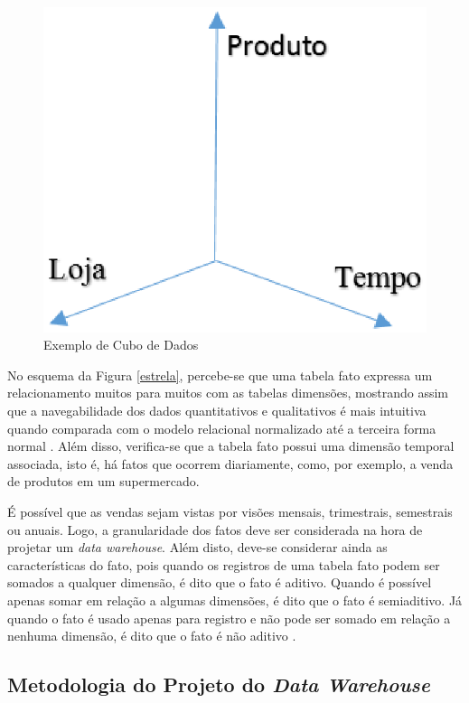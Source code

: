 \begin{figure}[h!]
\centering
\includegraphics[keepaspectratio=false,scale=0.85]{figuras/cube.eps}
\caption{Exemplo de Cubo de Dados}
\label{cube}
\end{figure}
\FloatBarrier


No esquema da Figura \ref{estrela}, percebe-se que uma tabela fato expressa um relacionamento muitos para muitos com as tabelas dimensões, mostrando assim que a navegabilidade dos dados quantitativos e qualitativos é mais intuitiva quando comparada com o modelo relacional normalizado até a terceira forma normal \cite{Kimball2002}. Além disso, verifica-se que a tabela fato possui uma dimensão temporal associada, isto é, há fatos que ocorrem diariamente, como, por exemplo, a venda de produtos em um supermercado. 

É possível que as vendas sejam vistas por visões mensais, trimestrais, semestrais ou anuais. Logo, a granularidade dos fatos deve ser considerada na hora de projetar um \textit{data warehouse}. Além disto, deve-se considerar ainda as características do fato, pois quando os registros de uma tabela fato podem ser somados a qualquer dimensão, é dito que o fato é aditivo. Quando é possível apenas somar em relação a algumas dimensões, é dito que o fato é semiaditivo. Já quando o fato é usado apenas para registro e não pode ser somado em relação a nenhuma dimensão, é dito que o fato é não aditivo \cite{Inmon1992}.

\subsection{Metodologia do Projeto do \textit{Data Warehouse}}
\label{sec:metodologia-dw}

